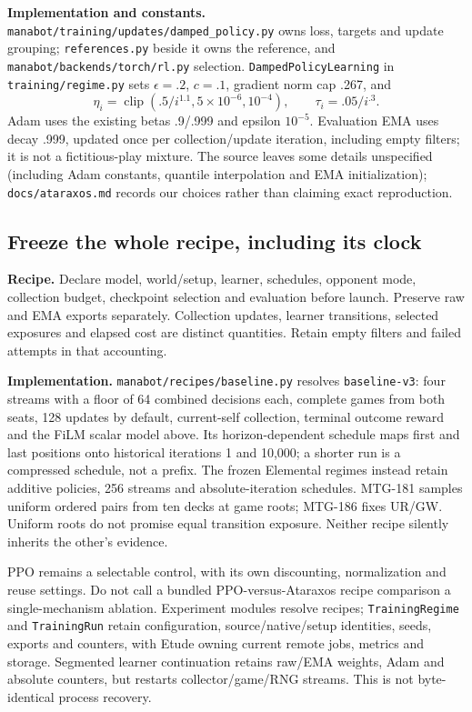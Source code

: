 \documentclass[11pt]{article}
\newcommand{\code}[1]{\texttt{\small #1}}
\begin{document}
\textbf{Implementation and constants.} \code{manabot/training/updates/damped\_policy.py} owns loss, targets and update grouping; \code{references.py} beside it owns the reference, and \code{manabot/backends/torch/rl.py} selection. \code{DampedPolicyLearning} in \code{training/regime.py} sets $\epsilon=.2$, $c=.1$, gradient norm cap .267, and
\[
 \eta_i=\operatorname{clip}(.5/i^{1.1},5\!\times\!10^{-6},10^{-4}),
 \qquad \tau_i=.05/i^{.3}.
\]
Adam uses the existing betas .9/.999 and epsilon $10^{-5}$. Evaluation EMA uses decay .999, updated once per collection/update iteration, including empty filters; it is not a fictitious-play mixture. The source leaves some details unspecified (including Adam constants, quantile interpolation and EMA initialization); \code{docs/ataraxos.md} records our choices rather than claiming exact reproduction.

\subsection{Freeze the whole recipe, including its clock}

\textbf{Recipe.} Declare model, world/setup, learner, schedules, opponent mode, collection budget, checkpoint selection and evaluation before launch. Preserve raw and EMA exports separately. Collection updates, learner transitions, selected exposures and elapsed cost are distinct quantities. Retain empty filters and failed attempts in that accounting.

\textbf{Implementation.} \code{manabot/recipes/baseline.py} resolves \code{baseline-v3}: four streams with a floor of 64 combined decisions each, complete games from both seats, 128 updates by default, current-self collection, terminal outcome reward and the FiLM scalar model above. Its horizon-dependent schedule maps first and last positions onto historical iterations 1 and 10,000; a shorter run is a compressed schedule, not a prefix. The frozen Elemental regimes instead retain additive policies, 256 streams and absolute-iteration schedules. MTG-181 samples uniform ordered pairs from ten decks at game roots; MTG-186 fixes UR/GW. Uniform roots do not promise equal transition exposure. Neither recipe silently inherits the other's evidence.

PPO remains a selectable control, with its own discounting, normalization and reuse settings. Do not call a bundled PPO-versus-Ataraxos recipe comparison a single-mechanism ablation. Experiment modules resolve recipes; \code{TrainingRegime} and \code{TrainingRun} retain configuration, source/native/setup identities, seeds, exports and counters, with Etude owning current remote jobs, metrics and storage. Segmented learner continuation retains raw/EMA weights, Adam and absolute counters, but restarts collector/game/RNG streams. This is not byte-identical process recovery.
\end{document}
